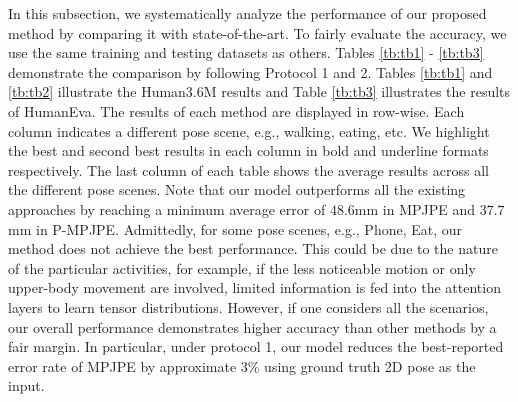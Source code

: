 \documentclass[twocolumn]{svjour3}          \smartqed  \usepackage{graphicx}
\begin{document}
In this subsection, we systematically analyze the performance of our proposed method by comparing it with state-of-the-art. To fairly evaluate the accuracy, we use the same training and testing datasets as others.  Tables \ref{tb:tb1} - \ref{tb:tb3} demonstrate the comparison by following Protocol 1 and 2. Tables \ref{tb:tb1} and \ref{tb:tb2} illustrate the Human3.6M results and Table \ref{tb:tb3} illustrates the results of HumanEva. The results of each method are displayed in row-wise. Each column indicates a different pose scene, e.g., walking, eating, etc. We highlight the best and second best results in each column in bold and underline formats respectively. The last column of each table shows the average results across all the different pose scenes. Note that our model outperforms all the existing approaches by reaching a minimum average error of $48.6$mm in MPJPE and $37.7$mm in P-MPJPE.  
Admittedly, for some pose scenes, e.g., Phone, Eat, our method does not achieve the best performance. This could be due to the nature of the particular activities, for example, if the less noticeable motion or only upper-body movement are involved, limited information is fed into the attention layers to learn tensor distributions. However, if one considers all the scenarios, our overall performance demonstrates higher accuracy than other methods by a fair margin. In particular, under protocol 1, our model reduces the best-reported error rate of MPJPE  \citep{Pavllo2019} by approximate 3\% using ground truth 2D pose as the input.
\end{document}
